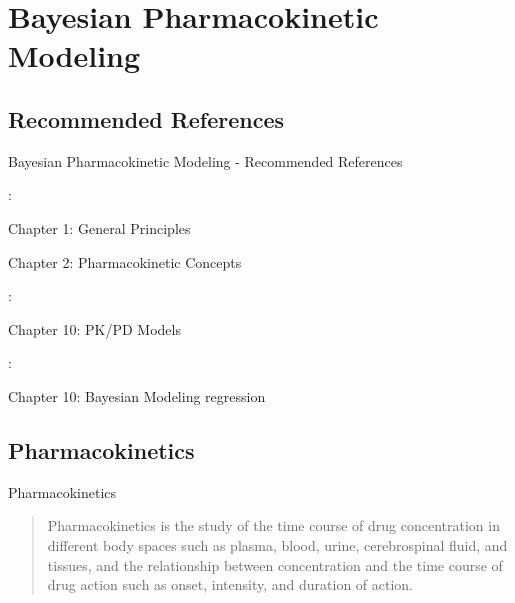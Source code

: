 \section{Bayesian Pharmacokinetic Modeling}

\subsection{Recommended References}
\begin{frame}{Bayesian Pharmacokinetic Modeling - Recommended References}
    \begin{vfilleditems}
        \item \textcite{Gabrielsson2006PKPDbook}:
        \begin{vfilleditems}
            \item Chapter 1: General Principles
            \item Chapter 2: Pharmacokinetic Concepts
        \end{vfilleditems}
        \item \textcite{Owen2014PKPDbook}:
        \begin{vfilleditems}
            \item Chapter 10: PK/PD Models
        \end{vfilleditems}
        \item \textcite{Bonate2011PKPDbook}:
        \begin{vfilleditems}
            \item Chapter 10: Bayesian Modeling regression
        \end{vfilleditems}
        \item \textcite{margossian2022torsten}
    \end{vfilleditems}
\end{frame}

\subsection{Pharmacokinetics}
\begin{frame}{Pharmacokinetics}
    \begin{defn}[Pharmacokinetics]
        \begin{quotation}
            Pharmacokinetics is the study of the time course of drug concentration in
            different body spaces such as plasma, blood, urine, cerebrospinal fluid, and
            tissues, and the relationship between concentration and the time course of
            drug action such as onset, intensity, and duration of action.
        \end{quotation}
        \vfill \vfill
        \textcite[13]{Gabrielsson2006PKPDbook}
    \end{defn}
\end{frame}


